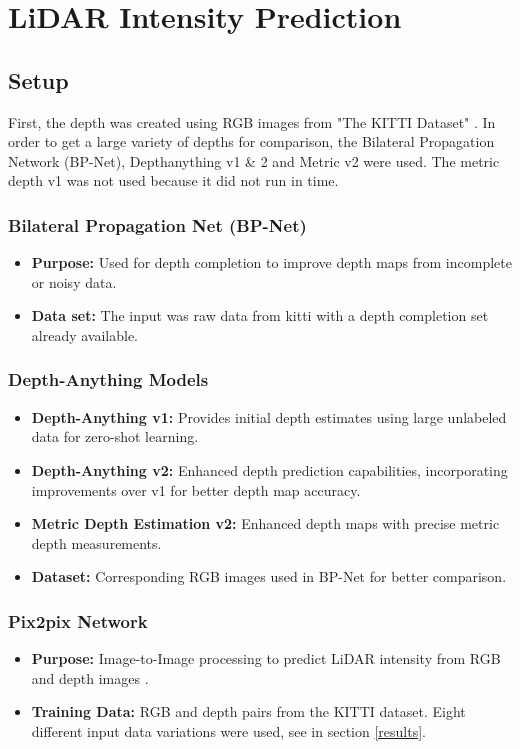\chapter{LiDAR Intensity Prediction} %
\section{Setup}
First, the depth was created using RGB images from "The KITTI Dataset" \cite{Geiger2013IJRR}. In order to get a large variety of depths for comparison, the Bilateral Propagation Network (BP-Net), Depthanything v1 \& 2 and Metric v2 were used. The metric depth v1 was not used because it did not run in time.
\subsection{Bilateral Propagation Net (BP-Net)}
\begin{itemize}
	\item \textbf{Purpose:} Used for depth completion to improve depth maps from incomplete or noisy data.
	\item \textbf{Data set:} The input was raw data from kitti with a depth completion set already available. 
\end{itemize}

\subsection{Depth-Anything Models}
\begin{itemize}
	\item \textbf{Depth-Anything v1:} Provides initial depth estimates using large unlabeled data for zero-shot learning.
	\item \textbf{Depth-Anything v2:} Enhanced depth prediction capabilities, incorporating improvements over v1 for better depth map accuracy.


 	\item \textbf {Metric Depth Estimation v2:} Enhanced depth maps with precise metric depth measurements.

	\item \textbf{Dataset:} Corresponding RGB images used in BP-Net for better comparison.
\end{itemize}

\subsection{Pix2pix Network}
\begin{itemize}
	\item \textbf{Purpose:} Image-to-Image processing to predict LiDAR intensity from RGB and depth images \cite{CycleGAN2017} \cite{isola2017image}. 
	\item \textbf{Training Data:} RGB and depth pairs from the KITTI dataset.
	Eight different input data variations were used, see in section \ref{results}.
\end{itemize}


